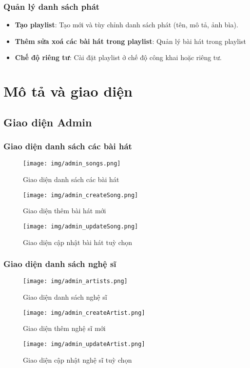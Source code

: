 \documentclass[a4paper,12pt]{article}
\begin{document}
\subsubsection{Quản lý danh sách phát}
\begin{itemize}
    \item  \textbf{Tạo playlist}: Tạo mới và tùy chỉnh danh sách phát (tên, mô tả, ảnh bìa).
    \item  \textbf{Thêm sửa xoá các bài hát trong playlist}: Quản lý bài hát trong playlist
    \item  \textbf{Chế độ riêng tư}: Cài đặt playlist ở chế độ công khai hoặc riêng tư.
\end{itemize}
\newpage
\section{Mô tả và giao diện}
\subsection{Giao diện Admin}
\subsubsection{Giao diện danh sách các bài hát}
\begin{figure}[H]
  \centering
  \texttt{[image: img/admin\_songs.png]}
  \caption{Giao diện danh sách các bài hát}
  \label{fig:admin-interface}
\end{figure}

\begin{figure}[H]
  \centering
  \texttt{[image: img/admin\_createSong.png]}
  \caption{Giao diện thêm bài hát mới}
  \label{fig:admin-interface}
\end{figure}
\begin{figure}[H]
  \centering
  \texttt{[image: img/admin\_updateSong.png]}
  \caption{Giao diện cập nhật bài hát tuỳ chọn}
  \label{fig:admin-interface}
\end{figure}
\subsubsection{Giao diện danh sách nghệ sĩ}
\begin{figure}[H]
  \centering
  \texttt{[image: img/admin\_artists.png]}
  \caption{Giao diện danh sách nghệ sĩ}
  \label{fig:admin-interface}
\end{figure}
\begin{figure}[H]
  \centering
  \texttt{[image: img/admin\_createArtist.png]}
  \caption{Giao diện thêm nghệ sĩ mới}
  \label{fig:admin-interface}
\end{figure}
\begin{figure}[H]
  \centering
  \texttt{[image: img/admin\_updateArtist.png]}
  \caption{Giao diện cập nhật nghệ sĩ tuỳ chọn}
  \label{fig:admin-interface}
\end{figure}
\end{document}
